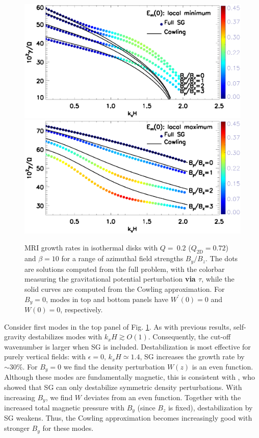 \begin{figure}
  \includegraphics[width=\linewidth,clip=true,trim=0cm 2cm 0cm
    0cm]{figures/compare_growth3_tilted_even.ps}  
  \includegraphics[width=\linewidth,clip=true,trim=0cm 0cm 0cm
    0.52cm]{figures/compare_growth3_tilted_odd.ps} 
  \caption{MRI growth rates in isothermal disks with $Q=~0.2$ ($Q_\mathrm{2D}=0.72$) and 
    $\beta=10$ for a range of azimuthal field strengths $B_y/B_z$. The
    dots are solutions computed from the full problem, with the
    colorbar measuring the gravitational potential perturbation {\bf
      via $\tau$}, while
    the solid curves are computed from the Cowling approximation. 
    For $B_y=0$, modes in top and bottom panels have
    $W^\prime(0)=0$ and $W(0)=0$, respectively.
    \label{compare_growth3_tilted}}
\end{figure}


Consider first modes in the top panel of 
Fig. \ref{compare_growth3_tilted}. As with previous results,  
self-gravity destabilizes modes with  $k_xH\gtrsim O(1)$. Consequently, the
cut-off wavenumber is larger when SG is included. 
Destabilization is most effective for purely vertical fields: with
$\epsilon=0,\, k_xH\simeq 1.4$, SG increases the growth rate by $\sim
30\%$. For $B_y=0$ we find the density perturbation $W(z)$ is an even
function. Although these modes are fundamentally magnetic, this is consistent with
\cite{goldreich65a}, who showed that SG can only destabilize 
symmetric density perturbations.  
With increasing $B_y$, we find $W$ deviates from an even
function. 
Together with the increased total magnetic pressure with 
$B_y$ (since $B_z$ is fixed), destabilization by SG weakens. 
Thus, the Cowling approximation becomes increasingly good with stronger
$B_y$ for these modes. 


